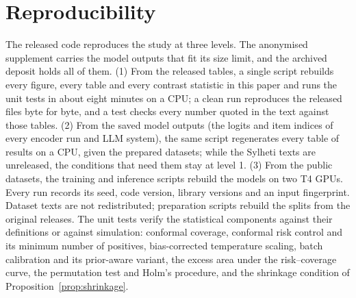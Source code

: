 \section{Reproducibility}
\label{sec:appendix-reproducibility}

The released code reproduces the study at three levels. The anonymised supplement carries the model outputs that fit
its size limit, and the archived deposit holds all of them. (1) From the released tables, a single script rebuilds every
figure, every table and every contrast statistic in this paper and runs the unit tests in about eight minutes on a CPU;
a clean run reproduces the released files byte for byte, and a test checks every number quoted in the text against
those tables. (2) From the saved model outputs (the logits and item indices of every encoder run and LLM system), the
same script regenerates every table of results on a CPU, given the prepared datasets; while the Sylheti texts are
unreleased, the conditions that need them stay at level 1. (3) From the public datasets, the training and inference
scripts rebuild the models on two T4 GPUs. Every run records its seed, code version, library versions and an input
fingerprint. Dataset texts are not redistributed; preparation scripts rebuild the splits from the original releases.
The unit tests verify the statistical components against their definitions or against simulation: conformal coverage,
conformal risk control and its minimum number of positives, bias-corrected temperature scaling, batch calibration and
its prior-aware variant, the excess area under the risk--coverage curve, the permutation test and Holm's procedure, and the shrinkage condition of
Proposition~\ref{prop:shrinkage}.
